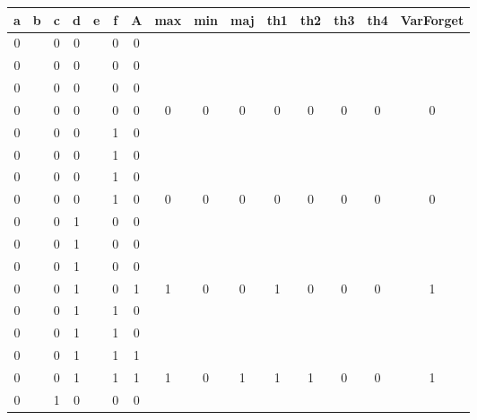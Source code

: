\begin{table}[!tb]
    \centering
    \begin{tabular}{|c|c|c|c|c|c|c|c|c|c|c|c|c|c|c|}
        \hline
        \textbf{a} & \textbf{b} & \textbf{c} & \textbf{d} & \textbf{e} & \textbf{f} & \textbf{A} & \textbf{max} & \textbf{min} & \textbf{maj} & \textbf{th1} & \textbf{th2} & \textbf{th3} & \textbf{th4} & \textbf{VarForget} \\ \hline
        \rowcolor{gray!40} 0 &  & 0 & 0 &  & 0 & 0 &  &  &  &  &  &  &  &  \\ \hline
        \rowcolor{gray!40} 0 &  & 0 & 0 &  & 0 & 0 &  &  &  &  &  &  &  &  \\ \hline
        \rowcolor{gray!40} 0 &  & 0 & 0 &  & 0 & 0 &  &  &  &  &  &  &  &  \\ \hline
        \rowcolor{gray!40} 0 &  & 0 & 0 &  & 0 & 0 & 0 & 0 & 0 & 0 & 0 & 0 & 0 & 0 \\ \hline
        \rowcolor{blue!40} 0 &  & 0 & 0 &  & 1 & 0 &  &  &  &  &  &  &  &  \\ \hline
        \rowcolor{blue!40} 0 &  & 0 & 0 &  & 1 & 0 &  &  &  &  &  &  &  &  \\ \hline
        \rowcolor{blue!40} 0 &  & 0 & 0 &  & 1 & 0 &  &  &  &  &  &  &  &  \\ \hline
        \rowcolor{blue!40} 0 &  & 0 & 0 &  & 1 & 0 & 0 & 0 & 0 & 0 & 0 & 0 & 0 & 0 \\ \hline
        \rowcolor{red!40} 0 &  & 0 & 1 &  & 0 & 0 &  &  &  &  &  &  &  &  \\ \hline
        \rowcolor{red!40} 0 &  & 0 & 1 &  & 0 & 0 &  &  &  &  &  &  &  &  \\ \hline
        \rowcolor{red!40} 0 &  & 0 & 1 &  & 0 & 0 &  &  &  &  &  &  &  &  \\ \hline
        \rowcolor{red!40} 0 &  & 0 & 1 &  & 0 & 1 & 1 & 0 & 0 & 1 & 0 & 0 & 0 & 1 \\ \hline
        \rowcolor{green!40} 0 &  & 0 & 1 &  & 1 & 0 &  &  &  &  &  &  &  &  \\ \hline
        \rowcolor{green!40} 0 &  & 0 & 1 &  & 1 & 0 &  &  &  &  &  &  &  &  \\ \hline
        \rowcolor{green!40} 0 &  & 0 & 1 &  & 1 & 1 &  &  &  &  &  &  &  &  \\ \hline
        \rowcolor{green!40} 0 &  & 0 & 1 &  & 1 & 1 & 1 & 0 & 1 & 1 & 1 & 0 & 0 & 1 \\ \hline
        \rowcolor{yellow!40} 0 &  & 1 & 0 &  & 0 & 0 &  &  &  &  &  &  &  &  \\ \hline

\end{tabular}
\end{table}
